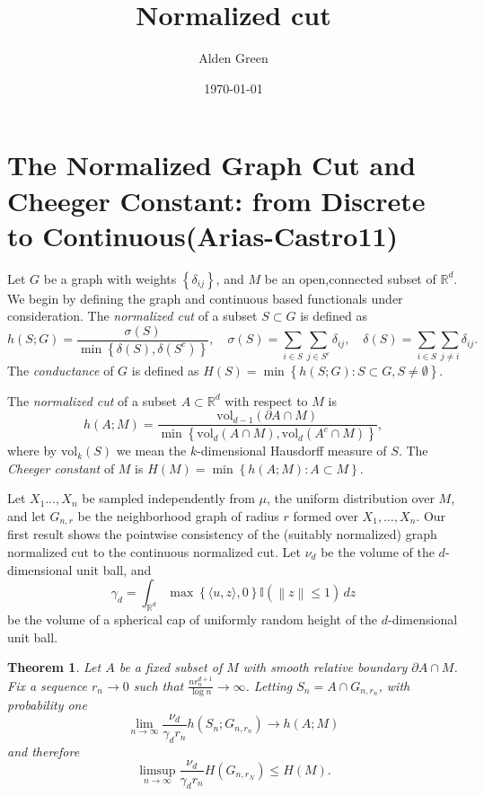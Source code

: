 \documentclass{article}
\newcommand{\Reals}{\mathbb{R}}
\newcommand{\norm}[1]{\left\lVert#1\right\rVert}
\newcommand{\set}[1]{\left\{#1\right\}}
\newcommand{\dotp}[2]{\langle #1, #2 \rangle}
\newcommand{\vol}{\text{vol}}
\newcommand{\1}{\mathbb{I}}
\newcommand{\Rd}{\Reals^d}
\theoremstyle{alden}
\theoremstyle{aldenthm}
\newtheorem{theorem}{Theorem}
\theoremstyle{definition}
\theoremstyle{remark}
\begin{document}
\title{Normalized cut}
\author{Alden Green}
\date{\today}
\maketitle

\section{The Normalized Graph Cut and Cheeger Constant: from Discrete to Continuous(Arias-Castro11)}

Let $G$ be a graph with weights $\set{\delta_{ij}}$, and $M$ be an open,connected subset of $\Rd$. We begin by defining the graph and continuous based functionals under consideration. The \emph{normalized cut} of a subset $S \subset G$ is defined as
\begin{equation*}
h(S;G) = \frac{\sigma(S)}{\min\set{\delta(S), \delta(S^c)}}, \quad \sigma(S) = \sum_{i \in S} \sum_{j \in S^c} \delta_{ij}, \quad \delta(S) = \sum_{i \in S} \sum_{j \neq i} \delta_{ij}.
\end{equation*}
The \emph{conductance} of $G$ is defined as $H(S) = \min\set{h(S;G): S \subset G, S \neq \emptyset}$. 

The \emph{normalized cut} of a subset $A \subset \Rd$ with respect to $M$ is
\begin{equation*}
h(A;M) = \frac{\vol_{d-1}(\partial A \cap M)}{\min\set{\vol_d(A \cap M), \vol_{d}(A^c \cap M)}},
\end{equation*}
where by $\vol_k(S)$ we mean the $k$-dimensional Hausdorff measure of $S$. The \emph{Cheeger constant} of $M$ is $H(M) = \min\set{h(A;M): A \subset M}$. 

Let $X_1\ldots,X_n$ be sampled independently from $\mu$, the uniform distribution over $M$, and let $G_{n,r}$ be the neighborhood graph of radius $r$ formed over $X_1,\ldots,X_n$. Our first result shows the pointwise consistency of the (suitably normalized) graph normalized cut to the continuous normalized cut. Let $\nu_d$ be the volume of the $d$-dimensional unit ball, and
\begin{equation*}
\gamma_d = \int_{\Rd} \max\set{\dotp{u}{z},0} \1(\norm{z} \leq 1) \,dz
\end{equation*}
be the volume of a spherical cap of uniformly random height of the $d$-dimensional unit ball.

\begin{theorem}
	Let $A$ be a fixed subset of $M$ with smooth relative boundary $\partial A \cap M$. Fix a sequence $r_n \to 0$ such that $\frac{nr_n^{d+1}}{\log n} \to \infty$. Letting $S_n = A \cap G_{n,r_n}$, with probability one
	\begin{equation*}
	\lim_{n \to \infty} \frac{\nu_d}{\gamma_d r_n} h(S_n; G_{n,r_n}) \to h(A;M)
	\end{equation*}
	and therefore
	\begin{equation*}
	\limsup_{n \to \infty}  \frac{\nu_d}{\gamma_d r_n} H(G_{n,r_N}) \leq H(M).
	\end{equation*}
\end{theorem}
\end{document}
